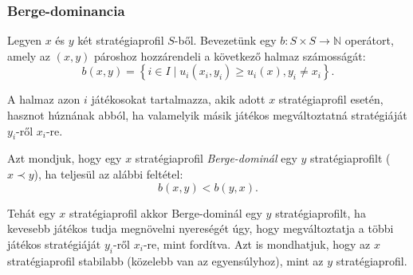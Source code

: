 \begin{table}[t]
  \centering
  \caption{Példa egy fogolydilemma típusú játékra.}\label{tab:BERGE_EGYENSULY}
\end{table}


\subsubsection{Berge-dominancia}
Legyen $x$ és $y$ két stratégiaprofil $S$-ből.
Bevezetünk egy $b \colon S \times S \to \mathbb{N}$ operátort, amely az $\left( x, y \right)$ pároshoz hozzárendeli a következő halmaz számosságát:
\[
  b(x, y) = \left\{ i \in I \mid u_i(x_i, y_i) \ge u_i(x), y_i \neq x_i \right\}.
\]

A halmaz azon $i$ játékosokat tartalmazza, akik adott $x$ stratégiaprofil esetén, hasznot húznának abból, ha valamelyik másik játékos megváltoztatná stratégiáját $y_i$-ről $x_i$-re.

\begin{ert}
  Azt mondjuk, hogy egy $x$ stratégiaprofil \emph{Berge-dominál} egy $y$ stratégiaprofilt ($x \prec y$), ha teljesül az alábbi feltétel:
  \begin{equation}\label{eqn:BERGE_DOMINANCIA}
    b(x,y) < b(y, x).
  \end{equation}
\end{ert}

Tehát egy $x$ stratégiaprofil akkor Berge-dominál egy $y$ stratégiaprofilt, ha kevesebb játékos tudja megnövelni nyereségét úgy, hogy megváltoztatja a többi játékos stratégiáját $y_i$-ről $x_i$-re, mint fordítva.
Azt is mondhatjuk, hogy az $x$ stratégiaprofil stabilabb (közelebb van az egyensúlyhoz), mint az $y$ stratégiaprofil.


